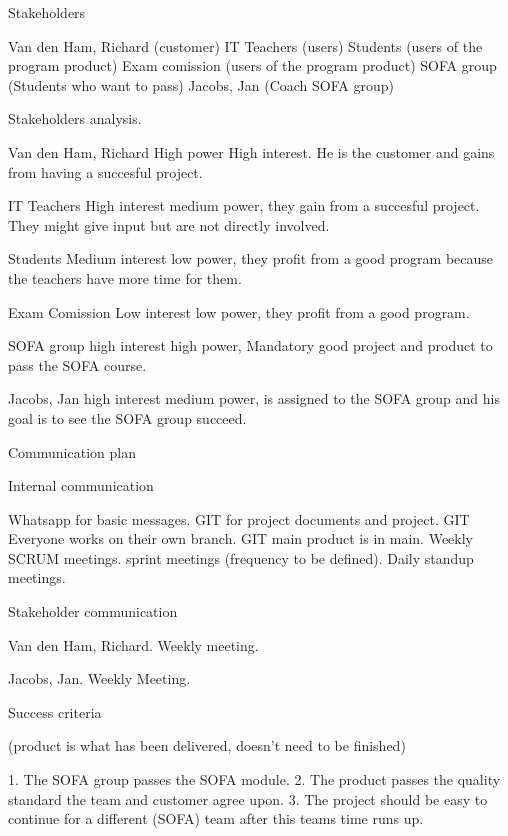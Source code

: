 Stakeholders

Van den Ham, Richard 	(customer)
IT Teachers 			(users)
Students 				(users of the program product)
Exam comission 			(users of the program product)
SOFA group				(Students who want to pass)
Jacobs, Jan				(Coach SOFA group) 



Stakeholders analysis.

Van den Ham, Richard
High power High interest. He is the customer and gains from having a succesful project.

IT Teachers 
High interest medium power, they gain from a succesful project. They might give input but are not directly involved.

Students
Medium interest low power, they profit from a good program because the teachers have more time for them. 

Exam Comission
Low interest low power, they profit from a good program.

SOFA group
high interest high power, Mandatory good project and product to pass the SOFA course.

Jacobs, Jan
high interest medium power, is assigned to the SOFA group and his goal is to see the SOFA group succeed.




Communication plan

Internal communication

Whatsapp for basic messages.
GIT for project documents and project.
GIT Everyone works on their own branch.
GIT main product is in main.
Weekly SCRUM meetings.
sprint meetings (frequency to be defined).
Daily standup meetings.


Stakeholder communication

Van den Ham, Richard. 
Weekly meeting.

Jacobs, Jan.
Weekly Meeting.



Success criteria

(product is what has been delivered, doesn't need to be finished)

1. The SOFA group passes the SOFA module.
2. The product passes the quality standard the team and customer agree upon.
3. The project should be easy to continue for a different (SOFA) team after this teams time runs up.
 





